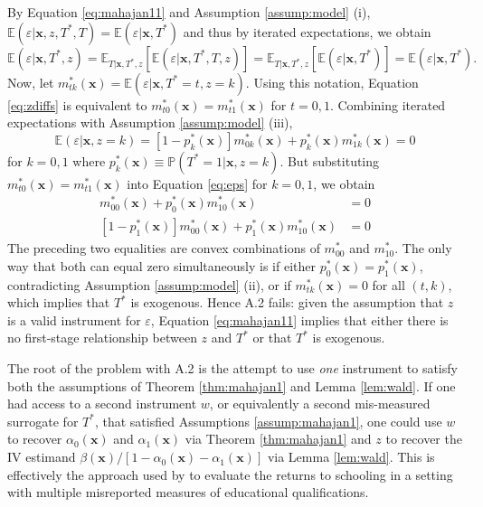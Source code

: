 By Equation \ref{eq:mahajan11} and Assumption \ref{assump:model} (i), $\mathbb{E}(\varepsilon|\mathbf{x},z,T^*,T)=\mathbb{E}(\varepsilon|\mathbf{x},T^*)$ and thus by iterated expectations, we obtain
\begin{equation}
  \mathbb{E}(\varepsilon|\mathbf{x},T^*,z) = \mathbb{E}_{T|\mathbf{x},T^*,z}\left[ \mathbb{E}(\varepsilon|\mathbf{x},T^*,T,z) \right] = \mathbb{E}_{T|\mathbf{x},T^*,z}\left[ \mathbb{E}(\varepsilon|\mathbf{x},T^*) \right] = \mathbb{E}(\varepsilon|\mathbf{x}, T^*).
  \label{eq:zdiffs}
\end{equation}
Now, let $m^*_{tk}(\mathbf{x}) = \mathbb{E}(\varepsilon|\mathbf{x}, T^*=t,z=k)$.
Using this notation, Equation \ref{eq:zdiffs} is equivalent to $m^*_{t0}(\mathbf{x}) = m^*_{t1}(\mathbf{x})$ for $t = 0, 1$.
Combining iterated expectations with Assumption \ref{assump:model} (iii), 
\begin{equation}
  \mathbb{E}(\varepsilon|\mathbf{x},z=k) = [1 - p^*_k(\mathbf{x})] m^*_{0k}(\mathbf{x}) + p^*_k(\mathbf{x}) m^*_{1k}(\mathbf{x}) = 0 
  \label{eq:eps}
\end{equation}
for $k = 0,1$ where $p^*_k(\mathbf{x}) \equiv \mathbb{P}(T^*=1|\mathbf{x}, z=k)$.
But substituting $m^*_{t0}(\mathbf{x}) = m^*_{t1}(\mathbf{x})$ into Equation \ref{eq:eps} for $k=0,1$, we obtain 
\begin{align*}
  [1 - p^*_0(\mathbf{x})] m^*_{00}(\mathbf{x}) + p^*_0(\mathbf{x}) m^*_{10}(\mathbf{x}) &= 0\\ 
  [1 - p^*_1(\mathbf{x})] m^*_{00}(\mathbf{x}) + p^*_1(\mathbf{x}) m^*_{10}(\mathbf{x}) &= 0
\end{align*}
The preceding two equalities are convex combinations of $m^*_{00}$ and $m^*_{10}$.
The only way that both can equal zero simultaneously is if either $p^*_0(\mathbf{x}) = p^*_1(\mathbf{x})$, contradicting Assumption \ref{assump:model} (ii), or if $m^*_{tk}(\mathbf{x}) = 0$ for all $(t,k)$, which implies that $T^*$ is exogenous.
Hence \cite{Mahajan} A.2 fails: given the assumption that $z$ is a valid instrument for $\varepsilon$, Equation \ref{eq:mahajan11} implies that either there is no first-stage relationship between $z$ and $T^*$ or that $T^*$ is exogenous.

The root of the problem with A.2 is the attempt to use \emph{one} instrument to satisfy both the assumptions of Theorem \ref{thm:mahajan1} and Lemma \ref{lem:wald}.
If one had access to a second instrument $w$, or equivalently a second mis-measured surrogate for $T^*$, that satisfied Assumptions \ref{assump:mahajan1}, one could use $w$  to recover $\alpha_0(\mathbf{x})$ and $\alpha_1(\mathbf{x})$ via Theorem \ref{thm:mahajan1} and $z$ to recover the IV estimand $\beta(\mathbf{x}) / [1 - \alpha_0(\mathbf{x}) - \alpha_1(\mathbf{x})]$ via Lemma \ref{lem:wald}.
This is effectively the approach used by \cite{Batt} to evaluate the returns to schooling in a setting with multiple misreported measures of educational qualifications.

